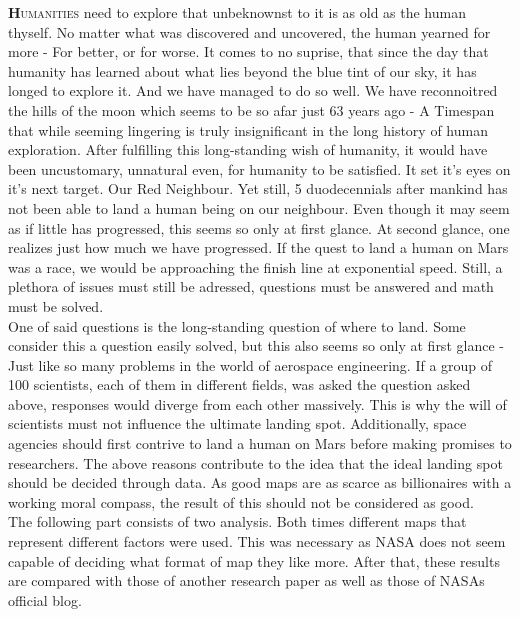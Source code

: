\documentclass{article}
\begin{document}
\begin{multicols}{3}%

\noindent
\lettrine[lraise=0.1, nindent=0em, slope=-.5em]{\textbf{H}}{umanities} need
to explore that unbeknownst to it is as old as
the human thyself. 
\noindent
No matter what was discovered and uncovered, the human yearned for more - For better, or for worse. 
It comes to no suprise, that since the day that humanity has learned about what lies beyond
the blue tint of our sky, it has longed to
explore it.
And we have managed to do so well.
We have reconnoitred the hills of the moon
which seems to be so afar just 63 years ago - A Timespan that while seeming lingering is truly insignificant in the long history of human exploration.
After fulfilling this long-standing wish of humanity, it
would have been uncustomary, unnatural even, for humanity to be satisfied.
It set it's eyes on it's next target. Our Red Neighbour.
Yet still, 5 duodecennials after mankind has not been able to land a human being on our neighbour.
Even though it may seem as if little has progressed, this seems so only at first glance.
At second glance, one realizes just how much we have progressed.
If the quest to land a human on Mars was a race, we would be approaching the finish line at exponential speed.
Still, a plethora of issues must still be adressed, questions must be answered and math must be solved. %
\\ %
One of said questions is the long-standing question of where to land.
Some consider this a question easily solved, but this also seems so only at first glance - Just like so many problems in the world of aerospace engineering.
If a group of 100 scientists, each of them in different fields, was asked the question asked above, responses would diverge from each other massively. 
This is why the will of scientists must not influence the ultimate landing spot.
Additionally, space agencies should first contrive to land a human on Mars before making promises to researchers.
The above reasons contribute to the idea that the ideal landing spot should be decided through data.
As good maps are as scarce as billionaires with a working moral compass, the result of this should not be considered as good.
\\
The following part consists of two analysis. Both times different maps that represent different factors were used.
This was necessary as NASA does not seem capable of deciding what format of map they like more.
After that, these results are compared with those of another research paper as well as those of NASAs official blog.


\end{multicols}
\end{document}
